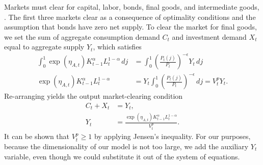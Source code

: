 \documentclass[12 pt, oneside]{article}
\theoremstyle{definition}
\theoremstyle{definition}
\theoremstyle{definition}
\begin{document}
Markets must clear for capital, labor, bonds, final goods, and intermediate goods, . The first three markets clear as a consequence of optimality conditions and the assumption that bonds have zero net supply. To clear the market for final goods, we set the sum of aggregate consumption demand $C_t$ and investment demand $X_t$ equal to aggregate supply $Y_t$, which satisfies
\begin{align*}
\int_0^1 \exp(\eta_{A, t}) K_{t - 1}^\alpha L_t^{1 - \alpha}\, dj & = \int_0^1\left(\frac{P_t(j)}{P_t}\right)^{-\epsilon} Y_t\, dj\\
  \exp(\eta_{A, t})K_{t - 1}^\alpha L_t^{1 - \alpha} & = Y_t \int_0^1\left(\frac{P_t(j)}{P_t}\right)^{-\epsilon} \, dj = V_t^p Y_t.
\end{align*}
Re-arranging yields the output market-clearing condition
\begin{align}\label{eq:output market clearing}
  C_t + X_t & = Y_t,\\
  \label{eq:aggregate supply}
  Y_t & = \frac{\exp(\eta_{A, t}) K_{t - 1}^{\alpha}L_t^{1 - \alpha}}{V_t^p}.
\end{align}
It can be shown that $V_t^p \geq 1$ by applying Jensen's inequality. For our purposes, because the dimensionality of our model is not too large, we add the auxiliary $Y_t$ variable, even though we could substitute it out of the system of equations.
\end{document}
